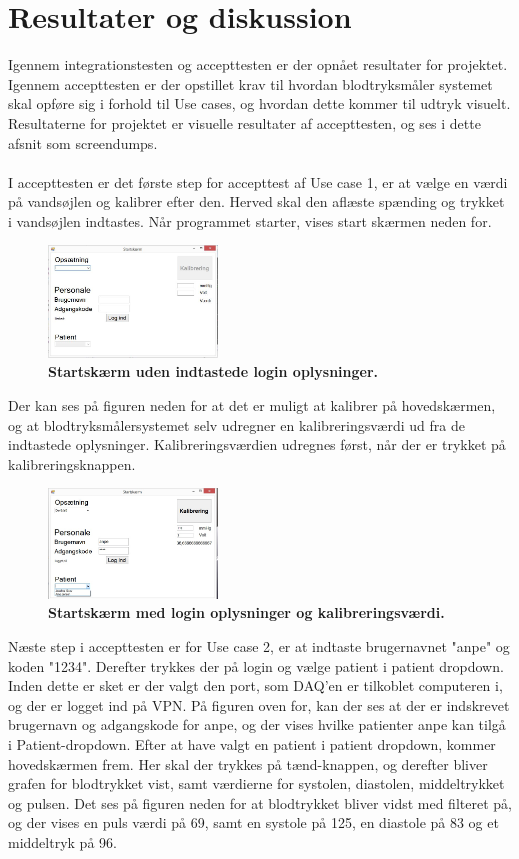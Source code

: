 \section{Resultater og diskussion}
Igennem integrationstesten og accepttesten er der opnået resultater for projektet. Igennem accepttesten er der opstillet krav til hvordan blodtryksmåler systemet skal opføre sig i forhold til Use cases, og hvordan dette kommer til udtryk visuelt. Resultaterne for projektet er visuelle resultater af accepttesten, og ses i dette afsnit som screendumps. \\\\
I accepttesten er det første step for accepttest af Use case 1, er at vælge en værdi på vandsøjlen og kalibrer efter den. Herved skal den aflæste spænding og trykket i vandsøjlen indtastes. Når programmet starter, vises start skærmen neden for.
\begin{figure}[H]
\includegraphics[width =0.4\textwidth , center]{billeder/ITstartGUI}
\caption{\textbf{Startskærm uden indtastede login oplysninger.}}
\end{figure}
Der kan ses på figuren neden for at det er muligt at kalibrer på hovedskærmen, og at blodtryksmålersystemet selv udregner en kalibreringsværdi ud fra de indtastede oplysninger. Kalibreringsværdien udregnes først, når der er trykket på kalibreringsknappen. 
\begin{figure}[H]
\includegraphics[width =0.4\textwidth , center]{billeder/ITstartGUIlogKali}
\caption{\textbf{Startskærm med login oplysninger og kalibreringsværdi.}}
\end{figure}
Næste step i accepttesten er for Use case 2, er at indtaste brugernavnet "anpe" og koden "1234". Derefter trykkes der på login og vælge patient i patient dropdown. Inden dette er sket er der valgt den port, som DAQ’en er tilkoblet computeren i, og der er logget ind på VPN. På figuren oven for, kan der ses at der er indskrevet brugernavn og adgangskode for anpe, og der vises hvilke patienter anpe kan tilgå i Patient-dropdown. Efter at have valgt en patient i patient dropdown, kommer hovedskærmen frem. Her skal der trykkes på tænd-knappen, og derefter bliver grafen for blodtrykket vist, samt værdierne for systolen, diastolen, middeltrykket og pulsen. Det ses på figuren neden for at blodtrykket bliver vidst med filteret på, og der vises en puls værdi på 69, samt en systole på 125, en diastole på 83 og et middeltryk på 96.
